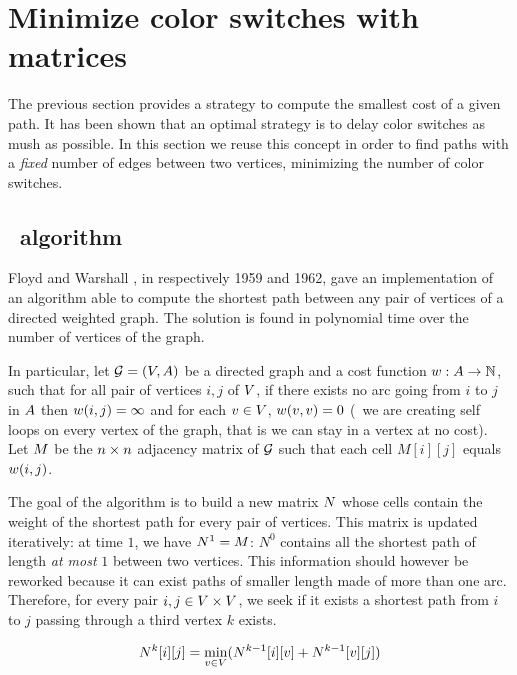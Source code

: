 \section{Minimize color switches with matrices}

The previous section provides a strategy to compute the smallest cost of a given path. It has been shown that an optimal strategy is to delay color switches as mush as possible. In this section we reuse this concept in order to find paths with a \textit{fixed} number of edges between two vertices, minimizing the number of color switches.

\subsection{\FW\ algorithm}
\label{sec:fwalgo}

Floyd \cite{floyd} and Warshall \cite{warshall}, in respectively 1959 and 1962, gave an implementation \cite{floydalgo} of an algorithm able to compute the shortest path between any pair of vertices of a directed weighted graph. The solution is found in polynomial time over the number of vertices of the graph.

In particular, let $\mathcal{G} = (V, A)$ be a directed graph and a cost function $w : A \rightarrow \mathbb{N}$, such that for all pair of vertices $i, j$ of $V$, if there exists no arc going from $i$ to $j$ in $A$ then $w(i,j) = \infty$ and for each $v \in V$, $w(v, v) = 0$ (\ie\ we are creating self loops on every vertex of the graph, that is we can stay in a vertex at no cost). Let $M$ be the $n \times n$ adjacency matrix of $\mathcal{G}$ such that each cell $M[i][j]$ equals $w(i, j)$.

The goal of the algorithm is to build a new matrix $N$ whose cells contain the weight of the shortest path for every pair of vertices. This matrix is updated iteratively: at time $1$, we have $N^1 = M$: $N^0$ contains all the shortest path of length \textit{at most} $1$ between two vertices. This information should however be reworked because it can exist paths of smaller length made of more than one arc. Therefore, for every pair $i, j \in V \times V$, we seek if it exists a shortest path from $i$ to $j$ passing through a third vertex $k$ exists.

\begin{equation}
  \label{eq:cellc}
  N^k[i][j] = \min_{v \in V} (N^{k-1}[i][v] + N^{k-1}[v][j])
\end{equation}

